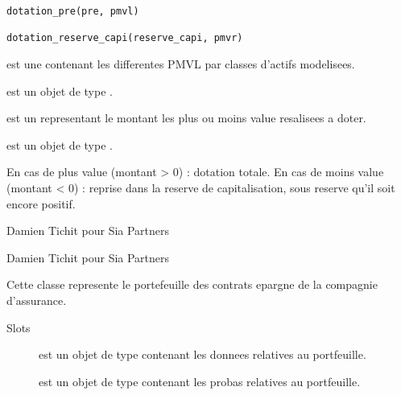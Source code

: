 \documentclass[a4paper]{book}
\begin{document}
%
\begin{Usage}
\begin{verbatim}
dotation_pre(pre, pmvl)

dotation_reserve_capi(reserve_capi, pmvr)
\end{verbatim}
\end{Usage}
%
\begin{Arguments}
\begin{ldescription}
\item[\code{pmvl}] est une  contenant les differentes PMVL par classes d'actifs modelisees.

\item[\code{reserve\_capi}] est un objet de type .

\item[\code{pmvr}] est un  representant le montant les plus ou moins value resalisees a doter.

\item[\code{reserve\_capi}] est un objet de type .
\end{ldescription}
\end{Arguments}
%
\begin{Details}\relax
En cas de plus value (montant > 0) : dotation totale.
En cas de moins value (montant < 0) : reprise dans la reserve de capitalisation, sous reserve qu'il soit encore positif.
\end{Details}
%
\begin{Author}\relax
Damien Tichit pour Sia Partners

Damien Tichit pour Sia Partners
\end{Author}
%
\begin{Description}\relax
Cette classe represente le portefeuille des contrats epargne de la compagnie d'assurance.
\end{Description}
%
\begin{Section}{Slots}

\begin{description}

\item[] est un objet de type  contenant les donnees relatives au portfeuille.

\item[] est un objet de type  contenant les probas relatives au portfeuille.

\end{description}
\end{Section}
\end{document}
